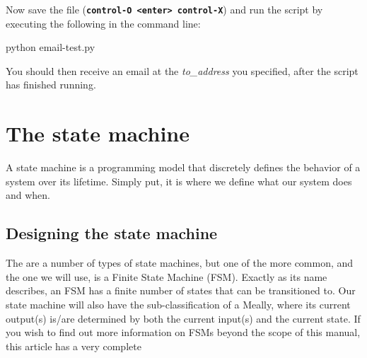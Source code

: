 \documentclass{article}
\newcommand*{\myfont}{\fontfamily{pcr}\selectfont}
\newcommand{\codeb}[2]{
  \begin{tcolorbox}[width=\textwidth,colback={SpringGreen},title={#1},colbacktitle=DarkGreen,coltitle=SpringGreen]
    \myfont
    #2
  \end{tcolorbox}
} %
\begin{document}
    \newline
    \noindent
    Now save the file (\textbf{\texttt{control-O <enter> control-X}}) and run the script by executing the following in the command line:
    \codeb{Run the test script for email}{
      python email-test.py
    }
    You should then receive an email at the \textit{to\_address} you specified, after the script has finished running.
\section{The state machine}
A state machine is a programming model that discretely defines the behavior of a system over its lifetime. Simply put, it is where we define what our system does and when.
  \subsection{Designing the state machine}
  The are a number of types of state machines, but one of the more common, and the one we will use, is a Finite State Machine (FSM). Exactly as its name describes, an FSM has a finite number of states that can be transitioned to. Our state machine will also have the sub-classification of a Meally, where its current output(s) is/are determined by both the current input(s) and the current state. If you wish to find out more information on FSMs beyond the scope of this manual, this article has a very complete
\end{document}
